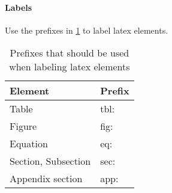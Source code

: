 \paragraph{Labels}
Use the prefixes in \cref{tab:prefixes} to label latex elements.

\begin{table}[H]
    \begin{center}
    \caption{Prefixes that should be used when labeling latex elements}
    \label{tab:prefixes}
    \begin{tabular}{ll}
    \toprule
    Element & Prefix \\ \midrule
    Table & tbl: \\
    Figure & fig: \\
    Equation & eq: \\
    Section, Subsection & sec: \\
    Appendix section & app: \\ \bottomrule
    \end{tabular}
    \end{center}
\end{table}
